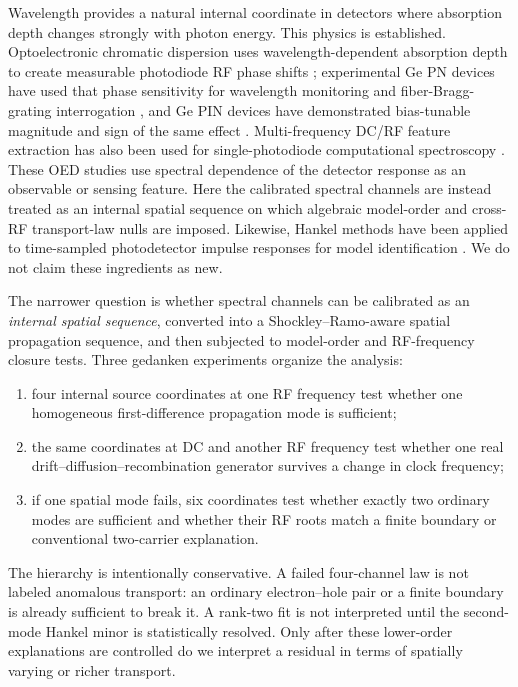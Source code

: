 \documentclass[11pt]{article}
\begin{document}
Wavelength provides a natural internal coordinate in detectors where absorption depth changes strongly with photon energy. This physics is established. Optoelectronic chromatic dispersion uses wavelength-dependent absorption depth to create measurable photodiode RF phase shifts \cite{Glasser2021}; experimental Ge PN devices have used that phase sensitivity for wavelength monitoring and fiber-Bragg-grating interrogation \cite{Liokumovitch2021}, and Ge PIN devices have demonstrated bias-tunable magnitude and sign of the same effect \cite{Dutta2024}. Multi-frequency DC/RF feature extraction has also been used for single-photodiode computational spectroscopy \cite{Kassa2026}. These OED studies use spectral dependence of the detector response as an observable or sensing feature. Here the calibrated spectral channels are instead treated as an internal spatial sequence on which algebraic model-order and cross-RF transport-law nulls are imposed. Likewise, Hankel methods have been applied to time-sampled photodetector impulse responses for model identification \cite{Sun2025}. We do not claim these ingredients as new.

The narrower question is whether spectral channels can be calibrated as an \emph{internal spatial sequence}, converted into a Shockley--Ramo-aware spatial propagation sequence, and then subjected to model-order and RF-frequency closure tests. Three gedanken experiments organize the analysis:
\begin{enumerate}[label=(\roman*)]
    \item four internal source coordinates at one RF frequency test whether one homogeneous first-difference propagation mode is sufficient;
    \item the same coordinates at DC and another RF frequency test whether one real drift--diffusion--recombination generator survives a change in clock frequency;
    \item if one spatial mode fails, six coordinates test whether exactly two ordinary modes are sufficient and whether their RF roots match a finite boundary or conventional two-carrier explanation.
\end{enumerate}

The hierarchy is intentionally conservative. A failed four-channel law is not labeled anomalous transport: an ordinary electron--hole pair or a finite boundary is already sufficient to break it. A rank-two fit is not interpreted until the second-mode Hankel minor is statistically resolved. Only after these lower-order explanations are controlled do we interpret a residual in terms of spatially varying or richer transport.
\end{document}
